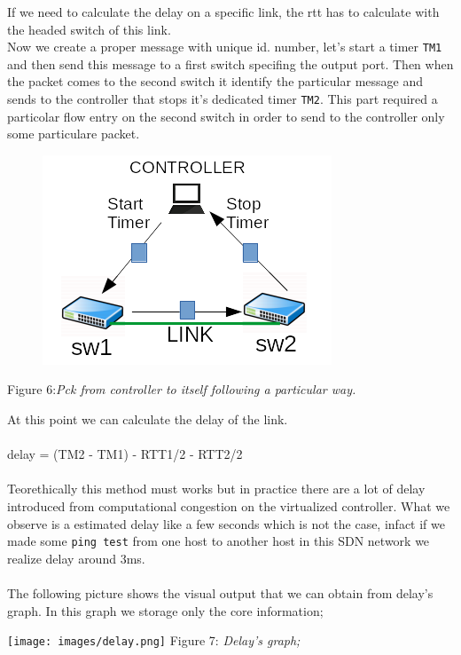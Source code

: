 \documentclass[article,10pt]{IEEEtran}
\begin{document}
If we need to calculate the delay on a specific link, the rtt has to calculate with the headed switch of this link.
\\
\newline
Now we create a proper message with unique id. number, let's start a timer \texttt{TM1} and then send this message to a first switch specifing the output port.
Then when the packet comes to the second switch it identify the particular message and sends to the controller that stops it's dedicated timer \texttt{TM2}.
\newline This part required a particolar flow entry on the second switch in order to send to the controller only some particulare packet.
\begin{figure}[!h]
 \centering
 \includegraphics[scale=0.70]{images/rtt1.png}
 \label{fig:topo}
\end{figure}

\begin{center}
  {Figure 6:\emph{Pck from controller to itself following a particular way.}}
\end{center}

At this point we can calculate the delay of the link.
\\
\\
 delay = (TM2 - TM1) - RTT1/2 - RTT2/2
\\
\\
Teorethically this method must works but in practice there are a lot of delay introduced from computational congestion on the virtualized controller.
What we observe is a estimated delay like a few seconds which is not the case, infact if we made some \texttt{ping test} from one host to another host
in this SDN network we realize delay around 3ms.
\\
\\
The following picture shows the visual output that we can obtain from delay's graph. In this graph we storage only the core information;
\begin{center}
 \centering
 \texttt{[image: images/delay.png]}
 {Figure 7:\emph{ Delay's graph;}}
 \label{fig:topo}
\end{center}
\end{document}
